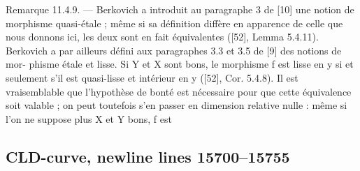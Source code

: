 \documentclass[
  10pt,
]{article}
\newenvironment{Shaded}{}{}
\newcommand{\NormalTok}[1]{#1}
\begin{document}
\begin{Shaded}
\begin{Highlighting}[]
\NormalTok{Remarque 11.4.9. — Berkovich a introduit au paragraphe 3 de [10] une notion de}
\NormalTok{morphisme quasi{-}étale ; même si sa définition diffère en apparence de celle que nous}
\NormalTok{donnons ici, les deux sont en fait équivalentes ([52], Lemma 5.4.11).}
\NormalTok{   Berkovich a par ailleurs défini aux paragraphes 3.3 et 3.5 de [9] des notions de mor{-}}
\NormalTok{phisme étale et lisse. Si Y et X sont bons, le morphisme f est lisse en y si et seulement}
\NormalTok{s’il est quasi{-}lisse et intérieur en y ([52], Cor. 5.4.8). Il est vraisemblable que l’hypothèse}
\NormalTok{de bonté est nécessaire pour que cette équivalence soit valable ; on peut toutefois s’en}
\NormalTok{passer en dimension relative nulle : même si l’on ne suppose plus X et Y bons, f est}
\end{Highlighting}
\end{Shaded}

\subsection{CLD-curve, newline lines
15700--15755}\label{cld-curve-newline-lines-1570015755}
\end{document}
